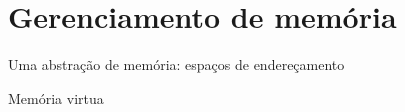 \chapter{Gerenciamento de memória}\label{cap:GerenciamentoMemoria}



Uma abstração de memória: espaços de
endereçamento


Memória virtua